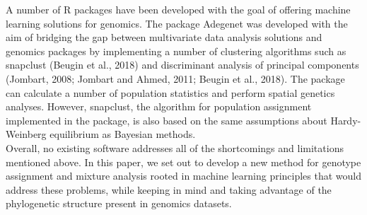 \documentclass{bioinfo}
\begin{document}
A number of R packages have been developed with the goal of offering machine learning solutions for genomics. The package Adegenet was developed with the aim of bridging the gap between multivariate data analysis solutions and genomics packages by implementing a number of clustering algorithms such as snapclust (Beugin et al., 2018) and discriminant analysis of principal components (Jombart, 2008; Jombart and Ahmed, 2011; Beugin et al., 2018). The package can calculate a number of population statistics and perform spatial genetics analyses. However, snapclust, the algorithm for population assignment implemented in the package, is also based on the same assumptions about Hardy-Weinberg equilibrium as Bayesian methods.\\
Overall, no existing software addresses all of the shortcomings and limitations mentioned above. In this paper, we set out to develop a new method for genotype assignment and mixture analysis rooted in machine learning principles that would address these problems, while keeping in mind and taking advantage of the phylogenetic structure present in genomics datasets.
\end{document}
